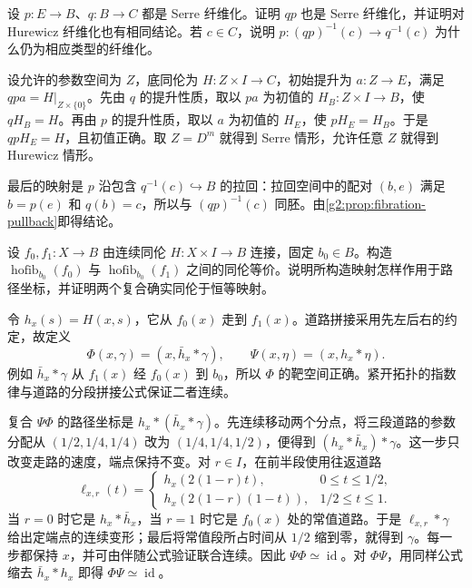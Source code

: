 \begin{exercise}\label{g2:ex:fibration-composition}
	设 \(p:E\rightarrow B\)、\(q:B\rightarrow C\) 都是 Serre 纤维化。证明 \(qp\) 也是 Serre 纤维化，并证明对 Hurewicz 纤维化也有相同结论。若 \(c\in C\)，说明 \(p:(qp)^{-1}(c)\rightarrow q^{-1}(c)\) 为什么仍为相应类型的纤维化。
\end{exercise}
\begin{solution}
	设允许的参数空间为 \(Z\)，底同伦为 \(H:Z\times I\rightarrow C\)，初始提升为 \(a:Z\rightarrow E\)，满足 \(qpa=H|_{Z\times\{0\}}\)。先由 \(q\) 的提升性质，取以 \(pa\) 为初值的 \(H_B:Z\times I\rightarrow B\)，使 \(qH_B=H\)。再由 \(p\) 的提升性质，取以 \(a\) 为初值的 \(H_E\)，使 \(pH_E=H_B\)。于是 \(qpH_E=H\)，且初值正确。取 \(Z=D^m\) 就得到 Serre 情形，允许任意 \(Z\) 就得到 Hurewicz 情形。

	最后的映射是 \(p\) 沿包含 \(q^{-1}(c)\hookrightarrow B\) 的拉回：拉回空间中的配对 \((b,e)\) 满足 \(b=p(e)\) 和 \(q(b)=c\)，所以与 \((qp)^{-1}(c)\) 同胚。由\cref{g2:prop:fibration-pullback}即得结论。
\end{solution}

\begin{exercise}\label{g2:ex:homotopic-maps-homotopy-fibers}
	设 \(f_0,f_1:X\rightarrow B\) 由连续同伦 \(H:X\times I\rightarrow B\) 连接，固定 \(b_0\in B\)。构造 \(\operatorname{hofib}_{b_0}(f_0)\) 与 \(\operatorname{hofib}_{b_0}(f_1)\) 之间的同伦等价。说明所构造映射怎样作用于路径坐标，并证明两个复合确实同伦于恒等映射。
\end{exercise}
\begin{solution}
	令 \(h_x(s)=H(x,s)\)，它从 \(f_0(x)\) 走到 \(f_1(x)\)。道路拼接采用先左后右的约定，故定义
	\[
		\Phi(x,\gamma)=(x,\bar h_x*\gamma),\qquad
		\Psi(x,\eta)=(x,h_x*\eta).
	\]
	例如 \(\bar h_x*\gamma\) 从 \(f_1(x)\) 经 \(f_0(x)\) 到 \(b_0\)，所以 \(\Phi\) 的靶空间正确。紧开拓扑的指数律与道路的分段拼接公式保证二者连续。

	复合 \(\Psi\Phi\) 的路径坐标是 \(h_x*(\bar h_x*\gamma)\)。先连续移动两个分点，将三段道路的参数分配从 \((1/2,1/4,1/4)\) 改为 \((1/4,1/4,1/2)\)，便得到 \((h_x*\bar h_x)*\gamma\)。这一步只改变走路的速度，端点保持不变。对 \(r\in I\)，在前半段使用往返道路
	\[
		\ell_{x,r}(t)=
		\begin{cases}
			h_x(2(1-r)t),&0\le t\le1/2,\\
			h_x(2(1-r)(1-t)),&1/2\le t\le1.
		\end{cases}
	\]
	当 \(r=0\) 时它是 \(h_x*\bar h_x\)，当 \(r=1\) 时它是 \(f_0(x)\) 处的常值道路。于是 \(\ell_{x,r}*\gamma\) 给出定端点的连续变形；最后将常值段所占时间从 \(1/2\) 缩到零，就得到 \(\gamma\)。每一步都保持 \(x\)，并可由伴随公式验证联合连续。因此 \(\Psi\Phi\simeq\operatorname{id}\)。对 \(\Phi\Psi\)，用同样公式缩去 \(\bar h_x*h_x\) 即得 \(\Phi\Psi\simeq\operatorname{id}\)。
\end{solution}

